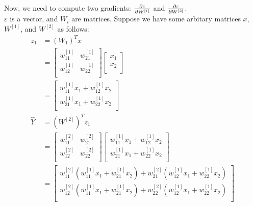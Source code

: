 Now, we need to compute two gradients: $\frac{\partial \varepsilon}{\partial W^{[1]}}$ and $\frac{\partial \varepsilon}{\partial W^{[2]}}$.\\
$\varepsilon$ is a vector, and $W_i$ are matrices.
Suppose we have some arbitary matrices $x$, $W^{[1]}$, and $W^{[2]}$ as follows:
\begin{align*}
    z_1 & = (W_1)^T x \\
    & = \left[ \begin{matrix}
        w^{[1]}_{11} & w^{[1]}_{21} \\
        w^{[1]}_{12} & w^{[1]}_{22} \\
    \end{matrix} \right] \left[
        \begin{matrix}
            x_1 \\
            x_2 \\
        \end{matrix}
    \right] \\
    & = \left[
        \begin{matrix}
            w^{[1]}_{11} x_1 + w^{[1]}_{12} x_2 \\
            w^{[1]}_{21} x_1 + w^{[1]}_{22} x_2 \\
        \end{matrix}
    \right] \\
    \hat{Y} & = (W^{[2]})^T z_1 \\
    & = \left[ \begin{matrix}
        w^{[2]}_{11} & w^{[2]}_{21} \\
        w^{[2]}_{12} & w^{[2]}_{22} \\
    \end{matrix} \right] \left[
        \begin{matrix}
            w^{[1]}_{11} x_1 + w^{[1]}_{12} x_2 \\
            w^{[1]}_{21} x_1 + w^{[1]}_{22} x_2 \\
        \end{matrix}
    \right] \\
    & = \left[
        \begin{matrix}
            w^{[2]}_{11} (w^{[1]}_{11} x_1 + w^{[1]}_{21} x_2) + w^{[2]}_{21} (w^{[1]}_{12} x_1 + w^{[1]}_{22} x_2) \\
            w^{[2]}_{12} (w^{[1]}_{11} x_1 + w^{[1]}_{21} x_2) + w^{[2]}_{22} (w^{[1]}_{12} x_1 + w^{[1]}_{22} x_2) \\
        \end{matrix}
    \right]
\end{align*}
